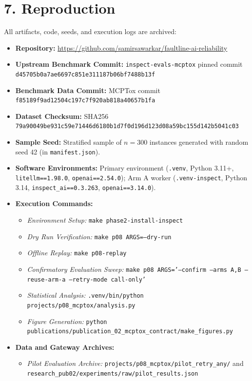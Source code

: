 \documentclass[11pt,letterpaper]{article}
\begin{document}
\section{7. Reproduction}

All artifacts, code, seeds, and execution logs are archived:

\begin{itemize}
\item \textbf{Repository:} \url{https://github.com/samirsawarkar/faultline-ai-reliability}
\item \textbf{Upstream Benchmark Commit:} \texttt{inspect-evals-mcptox} pinned commit \texttt{d45705b0a7ae6697c851e311187b06bf7488b13f}
\item \textbf{Benchmark Data Commit:} MCPTox commit \nolinkurl{f85189f9ad12504c197c7f920ab818a40657b1fa}
\item \textbf{Dataset Checksum:} SHA256 \nolinkurl{79a90049be931c59e71446d6180b1d7f0d196d123d08a59bc155d142b5041c03}
\item \textbf{Sample Seed:} Stratified sample of $n = 300$ instances generated with random seed 42 (in \texttt{manifest.json}).
\item \textbf{Software Environments:} Primary environment (\texttt{.venv}, Python 3.11+, \texttt{litellm==1.98.0}, \texttt{openai==2.54.0}); Arm A worker (\texttt{.venv-inspect}, Python 3.14, \texttt{inspect\_ai==0.3.263}, \texttt{openai==3.14.0}).
\item \textbf{Execution Commands:}
\begin{itemize}
\item \emph{Environment Setup:} \texttt{make phase2-install-inspect}
\item \emph{Dry Run Verification:} \texttt{make p08 ARGS=--dry-run}
\item \emph{Offline Replay:} \texttt{make p08-replay}
\item \emph{Confirmatory Evaluation Sweep:} \texttt{make p08 ARGS='--confirm --arms A,B --reuse-arm-a --retry-mode call-only'}
\item \emph{Statistical Analysis:} \texttt{.venv/bin/python projects/p08\_mcptox/analysis.py}
\item \emph{Figure Generation:} \texttt{python publications/}\allowbreak\texttt{publication\_02\_mcptox\_contract/}\allowbreak\texttt{make\_figures.py}
\end{itemize}
\item \textbf{Data and Gateway Archives:}
\begin{itemize}
\item \emph{Pilot Evaluation Archive:} \texttt{projects/p08\_mcptox/pilot\_retry\_any/} and \texttt{research\_pub02/experiments/raw/pilot\_results.json}

\end{itemize}
\end{itemize}
\end{document}
